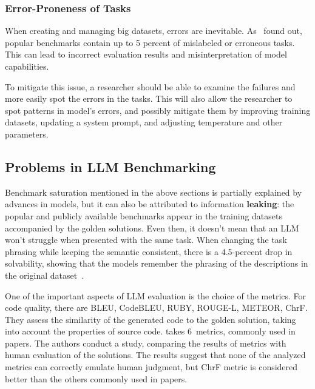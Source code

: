 \subsubsection{Error-Proneness of Tasks}

When creating and managing big datasets, errors are inevitable.
As~\cite{vendrow2025largelanguagemodelbenchmarks} found out, popular benchmarks contain up to 5 percent of mislabeled or erroneous tasks.
This can lead to incorrect evaluation results and misinterpretation of model capabilities.

To mitigate this issue, a researcher should be able to examine the failures and more easily spot the errors in the tasks.
This will also allow the researcher to spot patterns in model's errors, and possibly mitigate them by improving training datasets, updating a system prompt, and adjusting temperature and other parameters.

\subsection{Problems in LLM Benchmarking}


Benchmark saturation mentioned in the above sections is partially explained by advances in models, but it can also be attributed to information \textbf{leaking}: the popular and publicly available benchmarks appear in the training datasets accompanied by the golden solutions.
Even then, it doesn't mean that an LLM won't struggle when presented with the same task.
When changing the task phrasing while keeping the semantic consistent, there is a 4.5-percent drop in solvability, showing that the models remember the phrasing of the descriptions in the original dataset~\cite{uniyal2024one}.

One of the important aspects of LLM evaluation is the choice of the metrics.
For code quality, there are BLEU, CodeBLEU, RUBY, ROUGE-L, METEOR, ChrF\@.
They assess the similarity of the generated code to the golden solution, taking into account the properties of source code.
\cite{evtikhiev2023out} takes 6~metrics, commonly used in papers.
The authors conduct a study, comparing the results of metrics with human evaluation of the solutions.
The results suggest that none of the analyzed metrics can correctly emulate human judgment, but ChrF metric is considered better than the others commonly used in papers.

